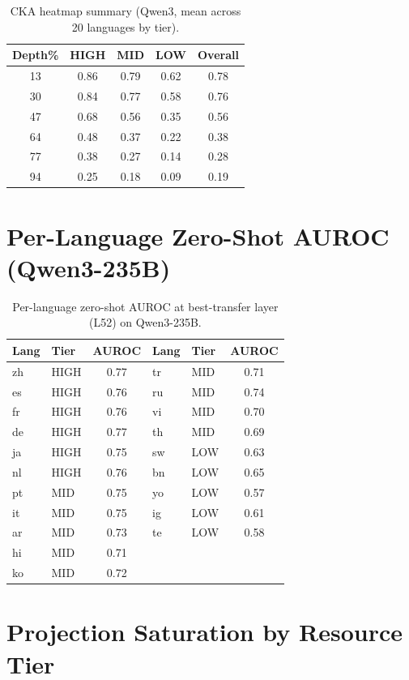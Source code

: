 \documentclass[11pt,a4paper]{article}
\begin{document}
\begin{table}[h]
\centering
\caption{CKA heatmap summary (Qwen3, mean across 20 languages by tier).}
\label{tab:cka_heatmap}
\small
\begin{tabular}{ccccc}
\toprule
Depth\% & HIGH & MID & LOW & Overall \\
\midrule
13 & 0.86 & 0.79 & 0.62 & 0.78 \\
30 & 0.84 & 0.77 & 0.58 & 0.76 \\
47 & 0.68 & 0.56 & 0.35 & 0.56 \\
64 & 0.48 & 0.37 & 0.22 & 0.38 \\
77 & 0.38 & 0.27 & 0.14 & 0.28 \\
94 & 0.25 & 0.18 & 0.09 & 0.19 \\
\bottomrule
\end{tabular}
\end{table}

\section{Per-Language Zero-Shot AUROC (Qwen3-235B)}
\label{app:per_lang_auroc}

\begin{table}[h]
\centering
\caption{Per-language zero-shot AUROC at best-transfer layer (L52) on Qwen3-235B.}
\label{tab:per_lang_auroc}
\small
\begin{tabular}{llc||llc}
\toprule
Lang & Tier & AUROC & Lang & Tier & AUROC \\
\midrule
zh & HIGH & 0.77 & tr & MID & 0.71 \\
es & HIGH & 0.76 & ru & MID & 0.74 \\
fr & HIGH & 0.76 & vi & MID & 0.70 \\
de & HIGH & 0.77 & th & MID & 0.69 \\
ja & HIGH & 0.75 & sw & LOW & 0.63 \\
nl & HIGH & 0.76 & bn & LOW & 0.65 \\
pt & MID  & 0.75 & yo & LOW & 0.57 \\
it & MID  & 0.75 & ig & LOW & 0.61 \\
ar & MID  & 0.73 & te & LOW & 0.58 \\
hi & MID  & 0.71 & & & \\
ko & MID  & 0.72 & & & \\
\bottomrule
\end{tabular}
\end{table}

\section{Projection Saturation by Resource Tier}
\label{app:proj_saturation}
\end{document}

